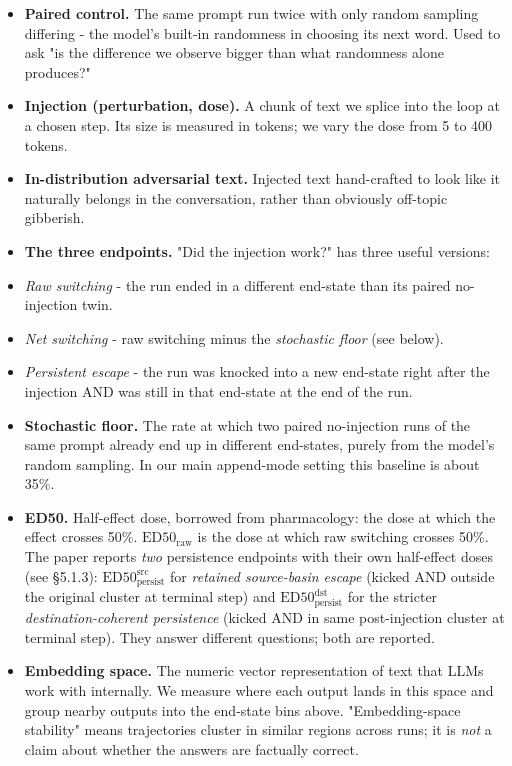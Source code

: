 \documentclass{article}
\theoremstyle{plain}
\theoremstyle{definition}
\begin{document}
\begin{itemize}
  \item \textbf{Paired control.} The same prompt run twice with only random
  sampling differing - the model's built-in randomness in choosing
  its next word. Used to ask "is the difference we observe bigger
  than what randomness alone produces?"
  \item \textbf{Injection (perturbation, dose).} A chunk of text we splice
  into the loop at a chosen step. Its size is measured in tokens;
  we vary the dose from 5 to 400 tokens.
  \item \textbf{In-distribution adversarial text.} Injected text hand-crafted
  to look like it naturally belongs in the conversation, rather
  than obviously off-topic gibberish.
  \item \textbf{The three endpoints.} "Did the injection work?" has three
  useful versions:
  \item \textit{Raw switching} - the run ended in a different end-state than
    its paired no-injection twin.
  \item \textit{Net switching} - raw switching minus the \textit{stochastic floor}
    (see below).
  \item \textit{Persistent escape} - the run was knocked into a new end-state
    right after the injection AND was still in that end-state at
    the end of the run.
  \item \textbf{Stochastic floor.} The rate at which two paired no-injection
  runs of the same prompt already end up in different end-states,
  purely from the model's random sampling. In our main append-mode
  setting this baseline is about 35\%.
  \item \textbf{ED50.} Half-effect dose, borrowed from pharmacology: the dose
  at which the effect crosses 50\%. $\mathrm{ED50}_{\mathrm{raw}}$ is
  the dose at which raw switching crosses 50\%. The paper reports
  \textit{two} persistence endpoints with their own half-effect doses (see
  §5.1.3): $\mathrm{ED50}_{\mathrm{persist}}^{\mathrm{src}}$ for
  \textit{retained source-basin escape} (kicked AND outside the original
  cluster at terminal step) and $\mathrm{ED50}_{\mathrm{persist}}^{\mathrm{dst}}$
  for the stricter \textit{destination-coherent persistence} (kicked AND
  in same post-injection cluster at terminal step). They answer
  different questions; both are reported.
  \item \textbf{Embedding space.} The numeric vector representation of text
  that LLMs work with internally. We measure where each output
  lands in this space and group nearby outputs into the end-state
  bins above. "Embedding-space stability" means trajectories cluster
  in similar regions across runs; it is \textit{not} a claim about whether
  the answers are factually correct.
\end{itemize}
\end{document}
